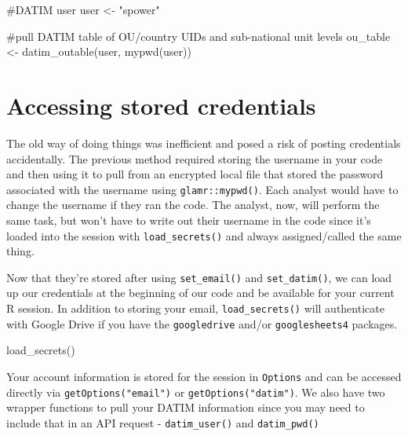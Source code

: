 \documentclass[
  letterpaper,
  DIV=11,
  numbers=noendperiod]{scrreprt}
\newenvironment{Shaded}{\begin{snugshade}}{\end{snugshade}}
\newcommand{\CommentTok}[1]{\textcolor[rgb]{0.37,0.37,0.37}{#1}}
\newcommand{\FunctionTok}[1]{\textcolor[rgb]{0.28,0.35,0.67}{#1}}
\newcommand{\NormalTok}[1]{\textcolor[rgb]{0.00,0.23,0.31}{#1}}
\newcommand{\OtherTok}[1]{\textcolor[rgb]{0.00,0.23,0.31}{#1}}
\newcommand{\StringTok}[1]{\textcolor[rgb]{0.13,0.47,0.30}{#1}}
\begin{document}
\begin{Shaded}
\begin{Highlighting}[]
\CommentTok{\#DATIM user}
\NormalTok{  user }\OtherTok{\textless{}{-}} \StringTok{"spower"}

\CommentTok{\#pull DATIM table of OU/country UIDs and sub{-}national unit levels}
\NormalTok{  ou\_table }\OtherTok{\textless{}{-}} \FunctionTok{datim\_outable}\NormalTok{(user, }\FunctionTok{mypwd}\NormalTok{(user))}
\end{Highlighting}
\end{Shaded}

\hypertarget{accessing-stored-credentials}{%
\section{Accessing stored
credentials}\label{accessing-stored-credentials}}

The old way of doing things was inefficient and posed a risk of posting
credentials accidentally. The previous method required storing the
username in your code and then using it to pull from an encrypted local
file that stored the password associated with the username using
\texttt{glamr::mypwd()}. Each analyst would have to change the username
if they ran the code. The analyst, now, will perform the same task, but
won't have to write out their username in the code since it's loaded
into the session with \texttt{load\_secrets()} and always
assigned/called the same thing.

Now that they're stored after using \texttt{set\_email()} and
\texttt{set\_datim()}, we can load up our credentials at the beginning
of our code and be available for your current R session. In addition to
storing your email, \texttt{load\_secrets()} will authenticate with
Google Drive if you have the \texttt{googledrive} and/or
\texttt{googlesheets4} packages.

\begin{Shaded}
\begin{Highlighting}[]
\FunctionTok{load\_secrets}\NormalTok{()}
\end{Highlighting}
\end{Shaded}

Your account information is stored for the session in \texttt{Options}
and can be accessed directly via \texttt{getOptions("email")} or
\texttt{getOptions("datim")}. We also have two wrapper functions to pull
your DATIM information since you may need to include that in an API
request - \texttt{datim\_user()} and \texttt{datim\_pwd()}
\end{document}

